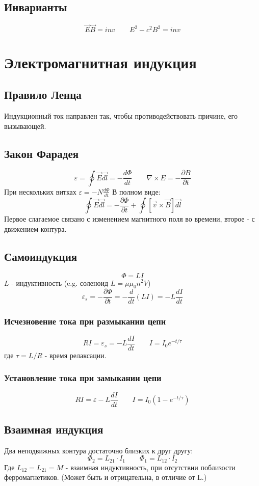 \documentclass{article}
\begin{document}
\subsection{Инварианты}
\[\vec{E}\vec{B}=inv \qquad E^2-c^2B^2=inv\]


\section{Электромагнитная индукция}

\subsection{Правило Ленца}
Индукционный ток направлен так, чтобы противодействовать причине, его вызывающей.

\subsection{Закон Фарадея}
\[\varepsilon=\oint\vec{E}\vec{dl}=-\frac{d\Phi}{dt} \qquad \nabla\times E=-\frac{\partial B}{\partial t}\]
При нескольких витках $\varepsilon=-N\frac{d\Phi}{dt}$
В полном виде:
\[\oint\vec{E}\vec{dl}=-\frac{\partial\Phi}{\partial t}+\oint[\vec{v}\times\vec{B}]\vec{dl}\]
Первое слагаемое связано с изменением магнитного поля во времени, второе - с движением контура.

\subsection{Самоиндукция}
\[\Phi=LI\]
$L$ - индуктивность (e.g. соленоид $L=\mu\mu_{0}n^{2}V$)
\[\varepsilon_{s}=-\frac{\partial\Phi}{\partial t}=-\frac{d}{dt}(LI)=-L\frac{dI}{dt}\]
\subsubsection{Исчезновение тока при размыкании цепи}
\[RI=\varepsilon_{s}=-L\frac{dI}{dt} \qquad I=I_{0}e^{-t/\tau}\]
где $\tau=L/R$ - время релаксации.
\subsubsection{Установление тока при замыкании цепи}
\[RI=\varepsilon-L\frac{dI}{dt} \qquad I=I_{0}(1-e^{-t/\tau})\]

\subsection{Взаимная индукция}
Два неподвижных контура достаточно близких к друг другу:
\[\Phi_{2}=L_{21}\cdot I_{1} \qquad \Phi_{1}=L_{12}\cdot I_{2}\]
Где $L_{12}=L_{21}=M$ - взаимная индуктивность, при отсутствии поблизости ферромагнетиков. (Может быть и отрицательна, в отличие от L.)
\end{document}
